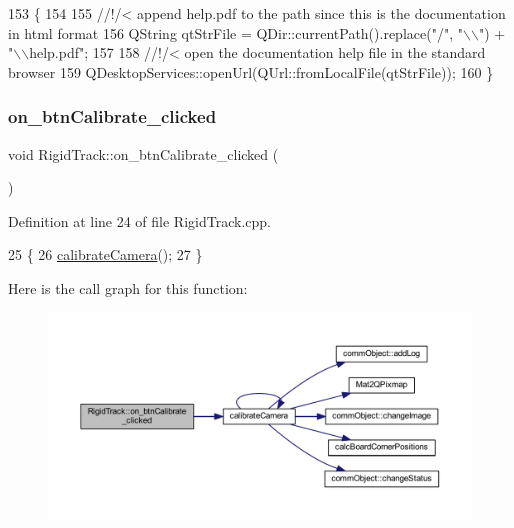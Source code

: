 \begin{DoxyCode}
153 \{
154     \textcolor{comment}{}
155 \textcolor{comment}{    //!/< append help.pdf to the path since this is the documentation in html format}
156 \textcolor{comment}{}    QString qtStrFile = QDir::currentPath().replace(\textcolor{stringliteral}{"/"}, \textcolor{stringliteral}{"\(\backslash\)\(\backslash\)"}) + \textcolor{stringliteral}{"\(\backslash\)\(\backslash\)help.pdf"};
157 \textcolor{comment}{}
158 \textcolor{comment}{    //!/< open the documentation help file in the standard browser}
159 \textcolor{comment}{}    QDesktopServices::openUrl(QUrl::fromLocalFile(qtStrFile));
160 \}
\end{DoxyCode}
\mbox{\label{class_rigid_track_aed2c39da404909142074f7dd2ce75a63}} 
\subsubsection{\texorpdfstring{on\+\_\+btn\+Calibrate\+\_\+clicked}{on\_btnCalibrate\_clicked}}
{\footnotesize\ttfamily void Rigid\+Track\+::on\+\_\+btn\+Calibrate\+\_\+clicked (\begin{DoxyParamCaption}{ }\end{DoxyParamCaption})\hspace{0.3cm}{\ttfamily [slot]}}



Definition at line 24 of file Rigid\+Track.\+cpp.


\begin{DoxyCode}
25 \{
26     \hyperlink{main_8cpp_a5f7c5996cd5a271d0277e0741f73a5b4}{calibrateCamera}();
27 \}
\end{DoxyCode}
Here is the call graph for this function\+:\nopagebreak
\begin{figure}[H]
\begin{center}
\leavevmode
\includegraphics[width=350pt]{class_rigid_track_aed2c39da404909142074f7dd2ce75a63_cgraph}
\end{center}
\end{figure}
\mbox{\label{class_rigid_track_a9a939d6db3d268e75a603cb3d492a91b}} 
